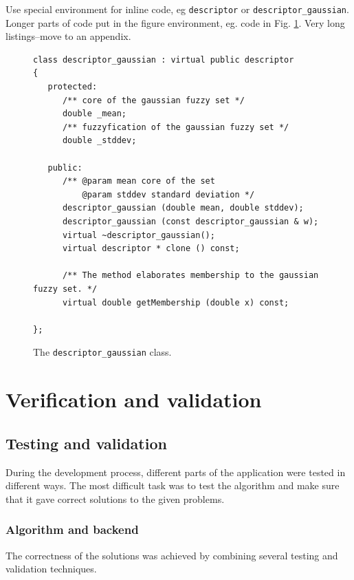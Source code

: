 \documentclass[a4paper,twoside,12pt]{book}
\begin{document}
Use special environment for inline code, eg \lstinline|descriptor| or \lstinline|descriptor_gaussian|. 
Longer parts of code put in the figure environment, eg. code in Fig. \ref{fig:pseudokod}. Very long listings–move to an appendix.

\begin{figure}
\centering
\begin{lstlisting}
class descriptor_gaussian : virtual public descriptor
{
   protected:
      /** core of the gaussian fuzzy set */
      double _mean;
      /** fuzzyfication of the gaussian fuzzy set */
      double _stddev;
      
   public:
      /** @param mean core of the set
          @param stddev standard deviation */
      descriptor_gaussian (double mean, double stddev);
      descriptor_gaussian (const descriptor_gaussian & w);
      virtual ~descriptor_gaussian();
      virtual descriptor * clone () const;
      
      /** The method elaborates membership to the gaussian fuzzy set. */
      virtual double getMembership (double x) const;
     
};
\end{lstlisting}
\caption{The \lstinline|descriptor_gaussian| class.}
\label{fig:pseudokod}
\end{figure}


\chapter{Verification and validation}
\section{Testing and validation}
During the development process, different parts of the application were tested in different ways. The most difficult task was to test the algorithm and make sure that it gave correct solutions to the given problems. 
\subsection{Algorithm and backend}
The correctness of the solutions was achieved by combining several testing and validation techniques.
\end{document}
